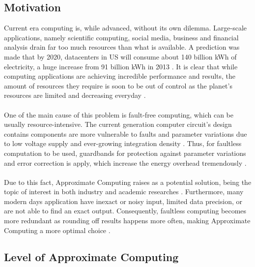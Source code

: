 \subsection{Motivation}

Current era computing is, while advanced, without its own dilemma. Large-scale applications, namely scientific computing, social media, business and financial analysis drain far too much resources than what is available. A prediction was made that by 2020, datacenters in US will consume about 140 billion kWh of electricity, a huge increase from 91 billion kWh in 2013 \cite{NRDC}. It is clear that while computing applications are achieving incredible performance and results, the amount of resources they require is soon to be out of control as the planet's resources are limited and decreasing everyday \cite{AxCSurvey}. \\
~\\
One of the main cause of this problem is fault-free computing, which can be usually resource-intensive. The current generation computer circuit's design contains components are more vulnerable to faults and parameter variations due to low voltage supply and ever-growing integration density \cite{1322441}. Thus, for faultless computation to be used, guardbands for protection against parameter variations and error correction is apply, which increase the energy overhead tremendously \cite{7348659}. \\
~\\
Due to this fact, Approximate Computing raises as a potential solution, being the topic of interest in both industry and academic researches \cite{7348659}. Furthermore, many modern days application have inexact or noisy input, limited data precision, or are not able to find an exact output. Consequently, faultless computing becomes more redundant as rounding off results happens more often, making Approximate Computing a more optimal choice \cite{AxCSurvey}. \\

\subsection{Level of Approximate Computing}

